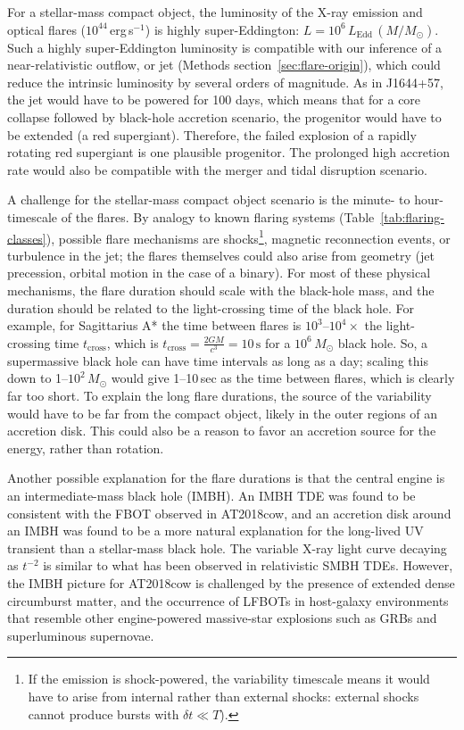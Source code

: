 \documentclass{nature_plusfigure}
\begin{document}
\begin{methods}
For a stellar-mass compact object, the luminosity of the X-ray emission and optical flares ($10^{44}\,$erg\,s$^{-1}$) is highly super-Eddington: $L=10^{6}\,L_\mathrm{Edd}\,(M/M_\odot)$. Such a highly super-Eddington luminosity is compatible with our inference of a near-relativistic outflow, or jet (Methods section~\ref{sec:flare-origin}), which could reduce the intrinsic luminosity by several orders of magnitude. As in J1644+57, the jet would have to be powered for 100 days, which means that for a core collapse followed by black-hole accretion scenario\cite{WoosleyHeger2012}, the progenitor would have to be extended (a red supergiant\cite{Quataert2012}). Therefore, the failed explosion of a rapidly rotating red supergiant is one plausible progenitor. The prolonged high accretion rate would also be compatible with the merger and tidal disruption scenario\cite{Metzger2022}.

A challenge for the stellar-mass compact object scenario is the minute- to hour-timescale of the flares. By analogy to known flaring systems (Table~\ref{tab:flaring-classes}), possible flare mechanisms are shocks\footnote{If the emission is shock-powered, the variability timescale means it would have to arise from internal rather than external shocks: external shocks cannot\cite{Kumar2015} produce bursts with $\delta t\ll T$).
}, magnetic reconnection events, or turbulence in the jet; the flares themselves could also arise from geometry (jet precession, orbital motion in the case of a binary). For most of these physical mechanisms, the flare duration should scale with the black-hole mass, and the duration should be related to the light-crossing time of the black hole. 
For example, for Sagittarius A* the time between flares is $10^{3}$--$10^{4}\times$ the light-crossing time $t_\mathrm{cross}$, which is $t_\mathrm{cross}=\frac{2GM}{c^3}=10\,\mathrm{s}$ for a $10^6\,M_\odot$ black hole.
So, a supermassive black hole can have time intervals as long as a day; scaling this down to 1--$10^2\,M_\odot$ would give 1--10\,sec as the time between flares, which is clearly far too short.
To explain the long flare durations, the source of the variability would have to be far from the compact object, likely in the outer regions of an accretion disk\cite{Metzger2022}. This could also be a reason to favor an accretion source for the energy, rather than rotation.

Another possible explanation for the flare durations is that the central engine is an intermediate-mass black hole (IMBH). An IMBH TDE was found to be consistent with the FBOT observed in AT2018cow\cite{Kuin2019,Perley2019}, and an accretion disk around an IMBH was found to be a more natural explanation for the long-lived UV transient than a stellar-mass black hole\cite{Chen2023}. The variable X-ray light curve decaying as $t^{-2}$ is similar to what has been observed in relativistic SMBH TDEs. However, the IMBH picture for AT2018cow is challenged\cite{Margutti2019,Metzger2022} by the presence of extended dense circumburst matter\cite{Ho2019,Nayana2021}, and the occurrence of LFBOTs in host-galaxy environments that resemble other engine-powered massive-star explosions such as GRBs and superluminous supernovae\cite{Lyman2020}. 


\end{methods}
\end{document}
